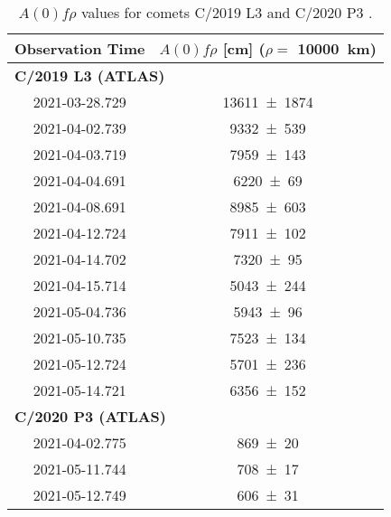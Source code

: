 \begin{table}
    \centering
    \caption{$A(0)f\rho$ values for comets C/2019 L3  and C/2020 P3 . }\label{tab:afrho}
    \begin{threeparttable}
        \begin{tabular}{cc}
            \toprule
            Observation Time & $A(0)f\rho$ [\unit{\cm}] ($\rho =$ \qty{10000}{\km}) \\
            \midrule
            \multicolumn{2}{l}{\textbf{C/2019 L3 (ATLAS)}} \\
            2021-03-28.729 & \num{13611 +- 1874} \\
            2021-04-02.739 & \num{9332 +- 539} \\
            2021-04-03.719 & \num{7959 +- 143} \\
            2021-04-04.691 & \num{6220 +- 69} \\
            2021-04-08.691 & \num{8985 +- 603} \\
            2021-04-12.724 & \num{7911 +- 102} \\
            2021-04-14.702 & \num{7320 +- 95} \\
            2021-04-15.714 & \num{5043 +- 244} \\
            2021-05-04.736 & \num{5943 +- 96} \\
            2021-05-10.735 & \num{7523 +- 134} \\
            2021-05-12.724 & \num{5701 +- 236} \\
            2021-05-14.721 & \num{6356 +- 152} \\
            \multicolumn{2}{l}{\textbf{C/2020 P3 (ATLAS)}} \\
            2021-04-02.775 & \num{869 +- 20} \\
            2021-05-11.744 & \num{708 +- 17} \\
            2021-05-12.749 & \num{606 +- 31} \\
            \bottomrule
        \end{tabular}
    \end{threeparttable}
\end{table}
